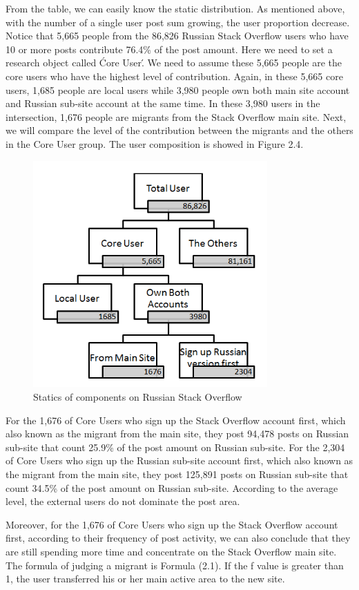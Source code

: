 \par
From the table, we can easily know the static distribution. As mentioned above, with the number of a single user post sum growing, the user proportion decrease. Notice that 5,665 people from the 86,826 Russian Stack Overflow users who have 10 or more posts contribute 76.4\% of the post amount. Here we need to set a research object called \'Core User\'. We need to assume these 5,665 people are the core users who have the highest level of contribution. Again, in these 5,665 core users, 1,685 people are local users while 3,980 people own both main site account and Russian sub-site account at the same time. In these 3,980 users in the intersection, 1,676 people are migrants from the Stack Overflow main site. Next, we will compare the level of the contribution between the migrants and the others in the Core User group. The user composition is showed in Figure 2.4.\par

\begin{figure}[!h]
	\centering
	\includegraphics[width = 0.80\textwidth]{figures/usercomponent.png}
	\caption{Statics of components on Russian Stack Overflow}
\end{figure}
\par
For the 1,676 of Core Users who sign up the Stack Overflow account first, which also known as the migrant from the main site, they post 94,478 posts on Russian sub-site that count 25.9\% of the post amount on Russian sub-site. For the 2,304 of Core Users who sign up the Russian sub-site account first, which also known as the migrant from the main site, they post 125,891 posts on Russian sub-site that count 34.5\% of the post amount on Russian sub-site. According to the average level, the external users do not dominate the post area. 
\par
Moreover, for the 1,676 of Core Users who sign up the Stack Overflow account first, according to their frequency of post activity, we can also conclude that they are still spending more time and concentrate on the Stack Overflow main site. The formula of judging a migrant is Formula (2.1). If the f value is greater than 1, the user transferred his or her main active area to the new site.


